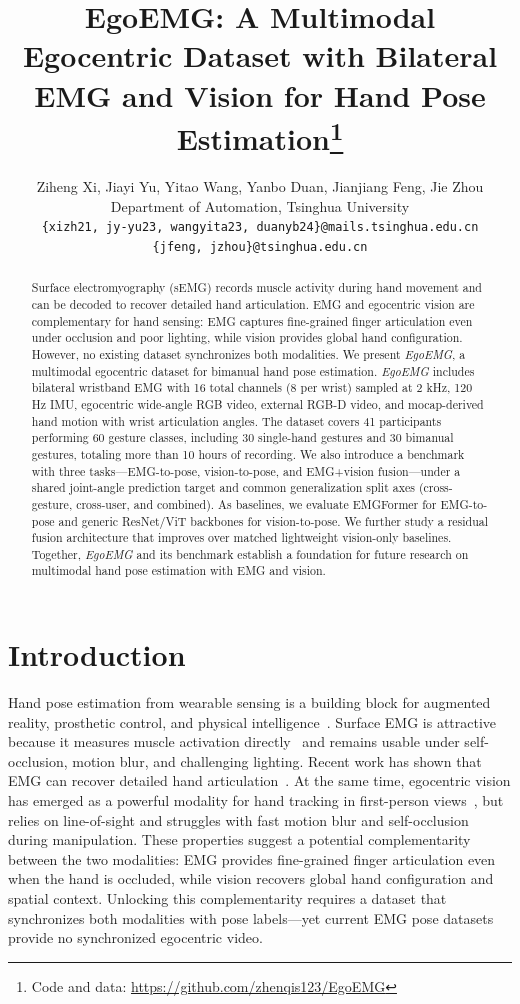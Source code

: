 \documentclass{article}
\title{EgoEMG: A Multimodal Egocentric Dataset with Bilateral EMG and Vision for Hand Pose Estimation\thanks{Code and data: \url{https://github.com/zhenqis123/EgoEMG}}}
\author{Ziheng Xi, Jiayi Yu, Yitao Wang, Yanbo Duan, Jianjiang Feng, Jie Zhou \\
Department of Automation, Tsinghua University \\
\texttt{\{xizh21, jy-yu23, wangyita23, duanyb24\}@mails.tsinghua.edu.cn} \\
\texttt{\{jfeng, jzhou\}@tsinghua.edu.cn}
}
\newcommand{\dataset}{\textit{EgoEMG}}
\newcommand{\model}{EMGFormer}
\begin{document}
\maketitle

\setlength{\textfloatsep}{8pt plus 2pt minus 2pt}
\setlength{\floatsep}{6pt plus 2pt minus 2pt}
\setlength{\intextsep}{6pt plus 2pt minus 2pt}

\begin{abstract}
Surface electromyography (sEMG) records muscle activity during hand movement and can be decoded to recover detailed hand articulation. EMG and egocentric vision are complementary for hand sensing: EMG captures fine-grained finger articulation even under occlusion and poor lighting, while vision provides global hand configuration. However, no existing dataset synchronizes both modalities. We present \dataset{}, a multimodal egocentric dataset for bimanual hand pose estimation. \dataset{} includes bilateral wristband EMG with 16 total channels (8 per wrist) sampled at 2 kHz, 120 Hz IMU, egocentric wide-angle RGB video, external RGB-D video, and mocap-derived hand motion with wrist articulation angles. The dataset covers 41 participants performing 60 gesture classes, including 30 single-hand gestures and 30 bimanual gestures, totaling more than 10 hours of recording. We also introduce a benchmark with three tasks---EMG-to-pose, vision-to-pose, and EMG+vision fusion---under a shared joint-angle prediction target and common generalization split axes (cross-gesture, cross-user, and combined). As baselines, we evaluate \model{} for EMG-to-pose and generic ResNet/ViT backbones for vision-to-pose. We further study a residual fusion architecture that improves over matched lightweight vision-only baselines. Together, \dataset{} and its benchmark establish a foundation for future research on multimodal hand pose estimation with EMG and vision.
\end{abstract}

\section{Introduction}

Hand pose estimation from wearable sensing is a building block for augmented reality, prosthetic control, and physical intelligence~\citep{emg2pose,ninapro,zhao2026dexemg}. Surface EMG is attractive because it measures muscle activation directly~\citep{farina2014} and remains usable under self-occlusion, motion blur, and challenging lighting. Recent work has shown that EMG can recover detailed hand articulation~\citep{emg2pose,emg2tendon,vqmyopose}. At the same time, egocentric vision has emerged as a powerful modality for hand tracking in first-person views~\citep{hamer,h2o}, but relies on line-of-sight and struggles with fast motion blur and self-occlusion during manipulation. These properties suggest a potential complementarity between the two modalities: EMG provides fine-grained finger articulation even when the hand is occluded, while vision recovers global hand configuration and spatial context. Unlocking this complementarity requires a dataset that synchronizes both modalities with pose labels---yet current EMG pose datasets provide no synchronized egocentric video.
\end{document}
